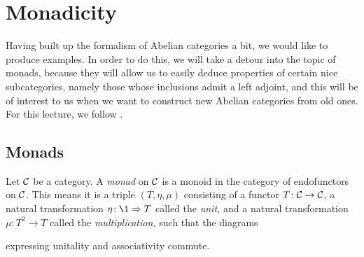 
\section{Monadicity}
Having built up the formalism of Abelian categories a bit, we would like to produce examples. In order to do this, we will take a detour into the topic of monads,
because they will allow us to easily deduce properties of certain nice subcategories, namely those whose inclusions admit a left adjoint, and this will be of interest
to us when we want to construct new Abelian categories from old ones. For this lecture, we follow \cite{riehl-category-theory-in-context}.

\subsection{Monads}
\begin{definition}
	Let \(\mathcal{C}\) be a category. A \emph{monad} on \(\mathcal{C}\) is a monoid in the category of endofunctors on \(\mathcal{C}\). This means it is a triple \((T,\eta,\mu)\) consisting of a functor \(T\!:\mathcal{C}\to\mathcal{C}\),
	a natural transformation \(\eta\!:\1 \To T\) called the \emph{unit,} and a natural transformation \(\mu\!:T^2\to T\) called the \emph{multiplication,} such that the diagrams
	\begin{center}
		\quad
	\end{center}
	expressing unitality and associativity commute.
\end{definition}

